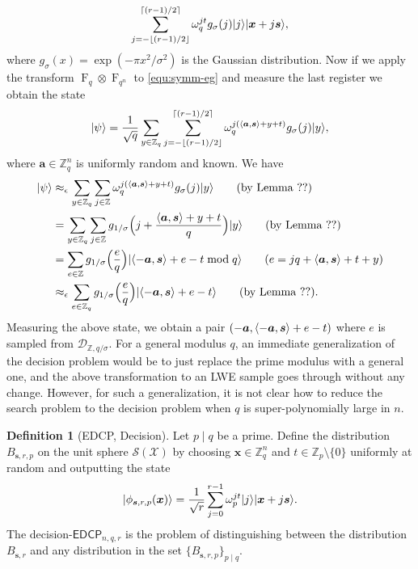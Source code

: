 \documentclass[11pt]{article}
\theoremstyle{plain}
\theoremstyle{definition}
\newtheorem{definition}[theorem]{Definition}
\DeclareMathOperator{\qft}{F}
\DeclarePairedDelimiter{\ket}{\lvert}{\rangle}
\DeclarePairedDelimiter{\lrang}{\langle}{\rangle}
\def\Z{\ensuremath{\mathbb{Z}}}
\def\edcp{\ensuremath{\mathsf{EDCP}}}
\begin{document}
\begin{equation}
    \label{equ:symm-eg}
    \sum_{j = -\lfloor (r - 1) / 2 \rfloor}^{\lceil (r - 1) / 2 \rceil} \omega_q^{jt} g_\sigma(j) \ket{j}\ket{\bm{x} + j\bm{s}},
\end{equation}
where $g_\sigma(x) = \exp(-\pi x^2 / \sigma^2)$ is the Gaussian distribution. Now if we apply the transform $\qft_q \otimes \qft_{q^n}$ to \eqref{equ:symm-eg} and measure the last register we obtain the state
\[ \ket{\psi} =  \frac{1}{\sqrt{q}} \sum_{y \in \Z_q} \sum_{j = -\lfloor (r - 1) / 2 \rfloor}^{\lceil (r - 1) / 2 \rceil} \omega_q^{j(\lrang{\bm{a}, \bm{s}} + y + t)} g_\sigma(j) \ket{y},\]
where $\bm{a} \in \Z_q^n$ is uniformly random and known. We have
\begin{align*}
    \ket{\psi}
    & \approx_\epsilon \sum_{y \in \Z_q} \sum_{j \in \Z} \omega_q^{j(\lrang{\bm{a}, \bm{s}} + y + t)} g_\sigma(j) \ket{y} \tag{by Lemma ??} \\
    & = \sum_{y \in \Z_q} \sum_{j \in \Z} g_{1/\sigma} \Big( j + \frac{\lrang{\bm{a}, \bm{s}} + y + t}{q} \Big) \ket{y} \tag{by Lemma ??} \\
    & = \sum_{e \in \Z} g_{1/\sigma} \Big( \frac{e}{q} \Big) \ket{\lrang{-\bm{a}, \bm{s}} + e - t \bmod q} \tag{$e = jq + \lrang{\bm{a}, \bm{s}} + t + y$} \\
    & \approx_\epsilon \sum_{e \in \Z_q} g_{1/\sigma} \Big( \frac{e}{q} \Big) \ket{\lrang{-\bm{a}, \bm{s}} + e - t} \tag{by Lemma ??}.
\end{align*}
Measuring the above state, we obtain a pair $(-\bm{a}, \lrang{-\bm{a}, \bm{s}} + e - t)$ where $e$ is sampled from $\mathcal{D}_{\Z, q / \sigma}$. For a general modulus $q$, an immediate generalization of the decision problem would be to just replace the prime modulus with a general one, and the above transformation to an LWE sample goes through without any change. However, for such a generalization, it is not clear how to reduce the search problem to the decision problem when $q$ is super-polynomially large in $n$.
\begin{definition}[EDCP, Decision]
    Let $p \mid q$ be a prime. Define the distribution $B_{\bm{s}, r, p}$ on the unit sphere $\mathcal{S(X)}$ by choosing $\bm{x} \in \Z_q^n$ and $t \in \Z_p {\setminus} \{ 0 \}$ uniformly at random and outputting the state
    \begin{equation}
        \ket{
            \phi_{\bm{s}, r, p}(\bm{x})} = \frac{1}{\sqrt{r}} \sum_{j = 0}^{r - 1} \omega_p^{jt} \ket{j}\ket{\bm{x} + j\bm{s}}.
    \end{equation}
    The decision-$\edcp_{n, q, r}$ is the problem of distinguishing between the distribution $B_{\bm{s}, r}$ and any distribution in the set $\{ B_{\bm{s}, r, p} \}_{p \mid q}$.
\end{definition}
\end{document}
